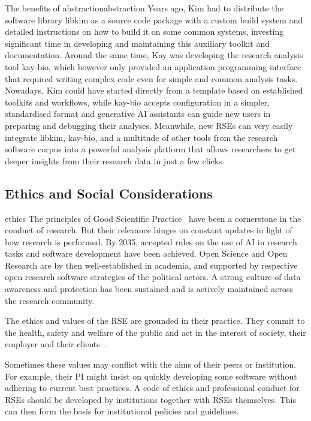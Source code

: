\documentclass{eceasst}
\begin{document}
\begin{story}{The benefits of abstraction}{abstraction}
Years ago, Kim had to distribute the software library libkim as a source code package
with a custom build system and detailed instructions on how to build it on some common systems,
investing significant time in developing and maintaining this auxiliary toolkit and documentation.
Around the same time, Kay was developing the research analysis tool kay-bio,
which however only provided an application programming interface that
required writing complex code even for simple and common analysis tasks.
Nowadays, Kim could have started directly from a template based on established toolkits and workflows,
while kay-bio accepts configuration in a simpler, standardised format and generative AI assistants
can guide new users in preparing and debugging their analyses.
Meanwhile, new RSEs can very easily integrate libkim, kay-bio, and a multitude
of other tools from the research software corpus into a powerful analysis
platform that allows researchers to get deeper insights from their research data
in just a few clicks.
\end{story}

\subsection{Ethics and Social Considerations}
\begin{whatis}{}{ethics}
The principles of Good Scientific Practice~\cite{dfg_gsp} have been a cornerstone in the conduct of research.
But their relevance hinges on constant updates in light of how research is performed.
By 2035, accepted rules on the use of AI in research tasks and software development have been achieved.
Open Science and Open Research are by then well-established in academia, and supported by respective open research software
strategies of the political actors.
A strong culture of data awareness and protection has been sustained and is actively maintained across the research community.
\end{whatis}

The ethics and values of the RSE are grounded in their practice.
They commit to the health, safety and welfare of the public and act in the interest of society, their employer and their clients~\cite{Goth2024}.

Sometimes these values may conflict with the aims of their peers or institution.
For example, their PI might insist on quickly developing some software without adhering to current best practices.
A code of ethics and professional conduct for RSEs should be developed by institutions together with RSEs themselves.
This can then form the basis for institutional policies and guidelines.
\end{document}
